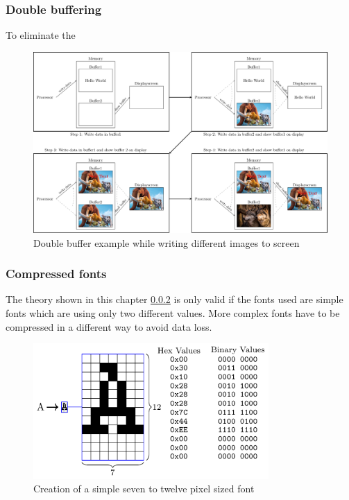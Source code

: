 \subsubsection{Double buffering}

To eliminate the 
  

\begin{figure}[H]
	\centering
	\includegraphics[width=1\textwidth]{2-theory/drawing-graphics/graphics/buffer.pdf}
	\caption{Double buffer example while writing different images to screen\label{theory:buffer}}
\end{figure}




\subsubsection{Compressed fonts}\label{chapter:CompressedFonts}

The theory shown in this chapter \ref{chapter:CompressedFonts} is only valid if the fonts used are simple fonts which are using only two different values. More complex fonts have to be compressed in a different way to avoid data loss. 
\begin{figure}[H]
	\centering
	\includegraphics[width=0.8\textwidth]{2-theory/drawing-graphics/graphics/font12.pdf}
	\caption{Creation of a simple seven to twelve pixel sized font\label{theory:font12}}
\end{figure}



